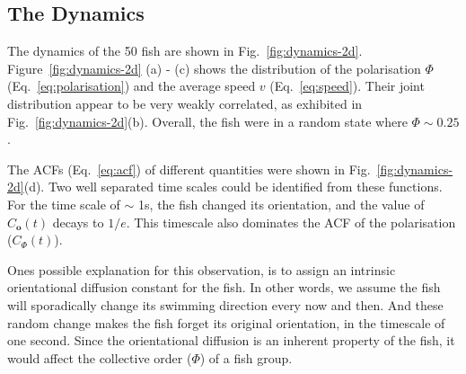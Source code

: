 \documentclass[11pt,twoside]{report}
\begin{document}
\subsection{The Dynamics}

The dynamics of the 50 fish are shown in Fig.~\ref{fig:dynamics-2d}. Figure~\ref{fig:dynamics-2d} (a) - (c) shows the distribution of the polarisation $\Phi$ (Eq.~\ref{eq:polarisation}) and the average speed $v$ (Eq.~\ref{eq:speed}). Their joint distribution appear to be very weakly correlated, as exhibited in Fig.~\ref{fig:dynamics-2d}(b). Overall, the fish were in a random state where $\Phi \sim 0.25$.



The ACFs (Eq.~\ref{eq:acf}) of different quantities were shown in Fig.~\ref{fig:dynamics-2d}(d). Two well separated time scales could be identified from these functions. For the time scale of $\sim$ 1s, the fish changed its orientation, and the value of $C_\mathbf{o}(t)$ decays to $1/e$. This timescale also dominates the ACF of the polarisation ($C_\Phi(t)$). 

Ones possible explanation for this observation, is to assign an intrinsic orientational diffusion constant for the fish. In other words, we assume the fish will sporadically change its swimming direction every now and then. And these random change makes the fish forget its original orientation, in the timescale of one second. Since the orientational diffusion is an inherent property of the fish, it would affect the collective order ($\Phi$) of a fish group.
\end{document}

